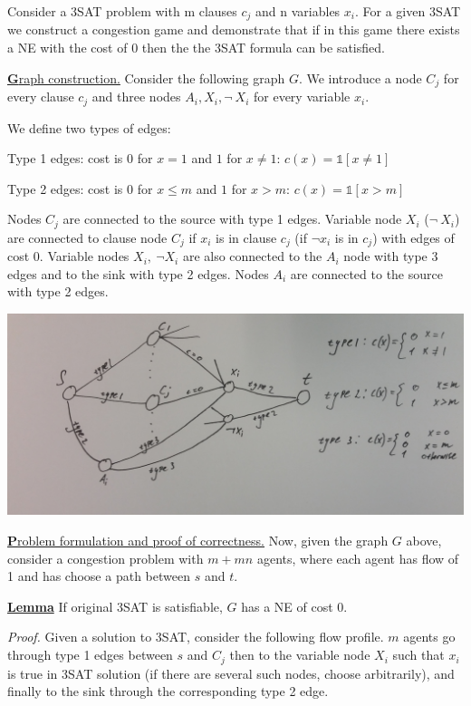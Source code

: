 Consider a 3SAT problem with m clauses $c_j$ and n variables $x_i$. For a given 3SAT we construct a congestion game and demonstrate that if in this game there exists a NE with the cost of 0 then the the 3SAT formula can be satisfied.
\bigskip

\uline{\textbf Graph construction.} Consider the following graph $G$. We introduce a node $C_j$ for every clause $c_j$ and three nodes $A_i,X_i,\neg\ X_i$ for every variable $x_i$.

We define two types of edges:

Type 1 edges: cost is 0 for $x=1$ and $1$ for $x\neq 1$: $c(x) = \mathbb 1[x\neq 1]$

Type 2 edges: cost is 0 for $x\leq m$ and $1$ for $x>m$: $c(x) = \mathbb 1 [x>m]$

Nodes $C_j$ are connected to the source with type 1 edges. Variable node $X_i$ ($\neg\ X_i$) are connected to clause node $C_j$ if $x_i$ is in clause $c_j$ (if $\neg x_i$ is in $c_j$) with edges of cost 0.  Variable nodes $X_i,\ \neg X_i$ are also connected to the $A_i$ node with type 3 edges and to the sink with type 2 edges. Nodes $A_i$ are connected to the source with type 2 edges.

\includegraphics[scale=0.1]{1.jpg}

\uline{\textbf Problem formulation and proof of correctness.} Now, given the graph $G$ above, consider a congestion problem with $m + mn$ agents, where each agent has flow of 1 and has choose a path between $s$ and $t$. 
\bigskip

\uline{\textbf{Lemma}} If original 3SAT is satisfiable, $G$ has a NE of cost 0.

\textit{Proof.} Given a solution to 3SAT, consider the following flow profile. $m$ agents go through type 1 edges between $s$ and $C_j$ then to the variable node $X_i$ such that $x_i$ is true in 3SAT solution (if there are several such nodes, choose arbitrarily), and finally to the sink through the corresponding type 2 edge. 

